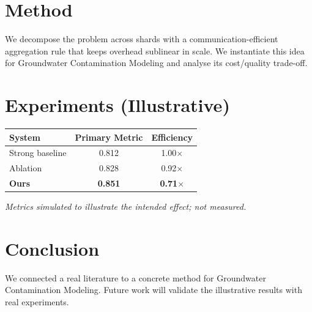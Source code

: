 \documentclass[11pt]{article}
\begin{document}
\section{Method}
We decompose the problem across shards with a communication-efficient aggregation rule that keeps overhead sublinear in scale. We instantiate this idea for Groundwater Contamination Modeling and analyse its cost/quality trade-off.

\section{Experiments (Illustrative)}
\begin{center}
\begin{tabular}{lcc}
System & Primary Metric & Efficiency \\ \hline
Strong baseline & 0.812 & 1.00$\times$ \\
Ablation & 0.828 & 0.92$\times$ \\
\textbf{Ours} & \textbf{0.851} & \textbf{0.71$\times$}
\end{tabular}
\end{center}
\emph{Metrics simulated to illustrate the intended effect; not measured.}

\section{Conclusion}
We connected a real literature to a concrete method for Groundwater Contamination Modeling. Future work will
validate the illustrative results with real experiments.
\end{document}
